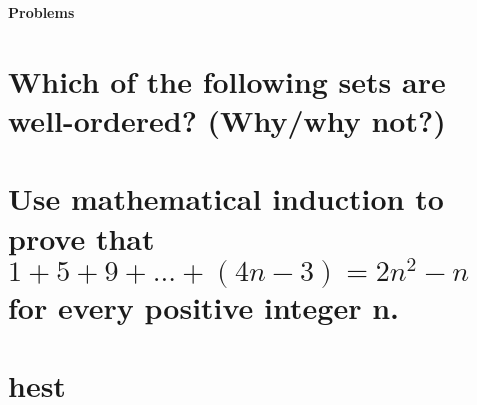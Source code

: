 \textbf{\Huge Problems}
\section{Which of the following sets are well-ordered? (Why/why not?)}


\section{Use mathematical induction to prove that $1+5+9+...+(4n-3)=2n^2-n$ for every positive integer n.}
{\Huge\Bat}


\section{hest}
{\Huge\Bat}
